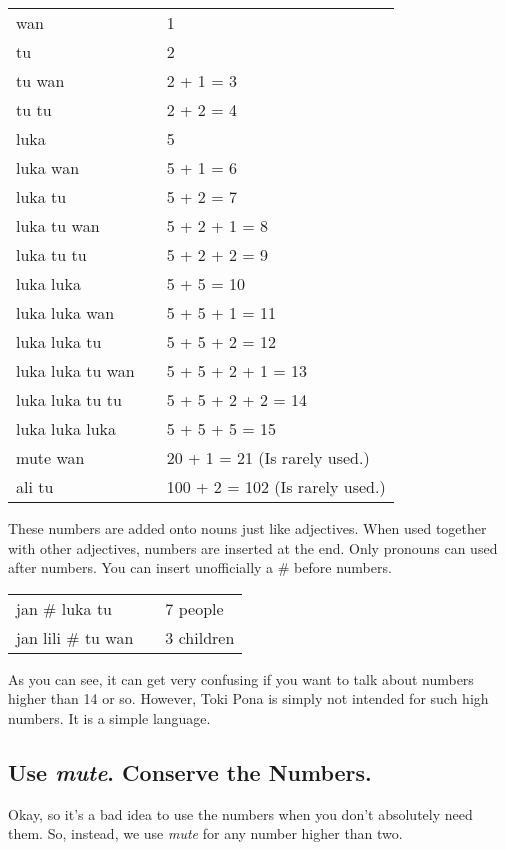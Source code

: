 \begin{supertabular}{p{5,5cm}|ll}
wan && 1 \\ 
tu  && 2 \\ 
tu wan && 2 + 1 = 3 \\
tu tu && 2 + 2 = 4 \\
luka && 5 \\
luka wan && 5 + 1 = 6 \\
luka tu && 5 + 2 = 7 \\
luka tu wan && 5 + 2 + 1 = 8 \\
luka tu tu && 5 + 2 + 2 = 9 \\
luka luka && 5 + 5 = 10 \\
luka luka wan && 5 + 5 + 1 = 11 \\
luka luka tu && 5 + 5 + 2 = 12 \\
luka luka tu wan && 5 + 5 + 2 + 1 = 13 \\
luka luka tu tu && 5 + 5 + 2 + 2 = 14 \\
luka luka luka && 5 + 5 + 5 = 15 \\
mute wan && 20 + 1 = 21 (Is rarely used.) \\
ali tu && 100 + 2 = 102 (Is rarely used.) \\
\end{supertabular} 

These numbers are added onto nouns just like adjectives. 
When used together with other adjectives, numbers are inserted at the end.
Only pronouns can used after numbers.
You can insert unofficially a \# before numbers. 

\begin{supertabular}{p{5,5cm}|ll}
jan \# luka tu && 7 people \\
jan lili \# tu wan && 3 children \\
\end{supertabular} 

As you can see, it can get very confusing if you want to talk about numbers higher than 14 or so.
However, Toki Pona is simply not intended for such high numbers. 
It is a simple language. 
%
%
\subsection*{Use \textit{mute}. Conserve the Numbers.}
%
%
Okay, so it's a bad idea to use the numbers when you don't absolutely need them. 
So, instead, we use \textit{mute} for any number higher than two.

